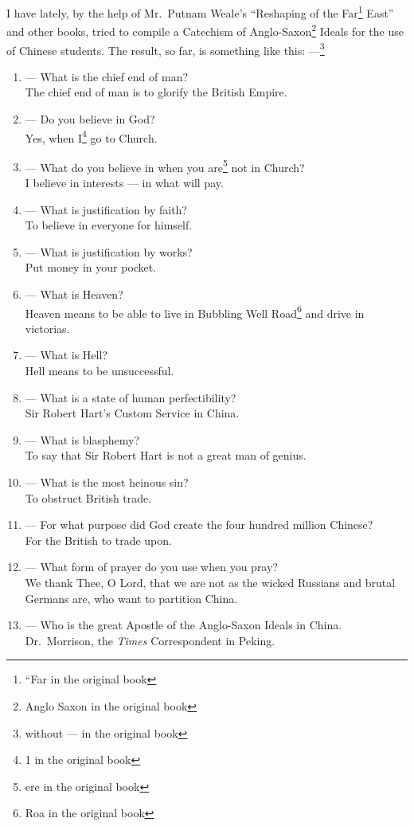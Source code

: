 I have lately, by the help of Mr.~Putnam Weale's ``Reshaping of the Far\footnote{``Far in the original book} East'' and other books, tried to compile a Catechism of Anglo-Saxon\footnote{Anglo Saxon in the original book} Ideals for the use of Chinese students.
The result, so far, is something like this: ---\footnote{without --- in the original book}
\begin{enumerate}
    \item --- What is the chief end of man? \\ The chief end of man is to glorify the British Empire.
    \item --- Do you believe in God? \\ Yes, when I\footnote{1 in the original book} go to Church.
    \item --- What do you believe in when you are\footnote{ere in the original book} not in Church? \\ I believe in interests --- in what will pay.
    \item --- What is justification by faith? \\ To believe in everyone for himself.
    \item --- What is justification by works? \\ Put money in your pocket.
    \item --- What is Heaven? \\ Heaven means to be able to live in Bubbling Well Road\footnote{Roa in the original book} and drive in victorias.
    \item --- What is Hell? \\ Hell means to be unsuccessful.
    \item --- What is a state of human perfectibility? \\ Sir Robert Hart's Custom Service in China.
    \item --- What is blasphemy? \\ To say that Sir Robert Hart is not a great man of genius.
    \item --- What is the most heinous sin? \\ To obstruct British trade.
    \item --- For what purpose did God create the four hundred million Chinese? \\ For the British to trade upon.
    \item --- What form of prayer do you use when you pray? \\ We thank Thee, O Lord, that we are not as the wicked Russians and brutal Germans are, who want to partition China.
    \item --- Who is the great Apostle of the Anglo-Saxon Ideals in China. \\ Dr.~Morrison, the \emph{Times} Correspondent in Peking.
\end{enumerate}


